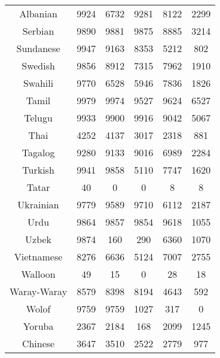 \begin{figure}[h]
\begin{tabular}{cccccc}
Albanian&9924&6732&9281&8122&2299\\
Serbian&9890&9881&9875&8885&3214\\
Sundanese&9947&9163&8353&5212&802\\
Swedish&9856&8912&7315&7962&1910\\
Swahili&9770&6528&5946&7836&1826\\
Tamil&9979&9974&9527&9624&6527\\
Telugu&9933&9900&9916&9042&5067\\
Thai&4252&4137&3017&2318&881\\
Tagalog&9280&9133&9016&6989&2284\\
Turkish&9941&9858&5110&7747&1620\\
Tatar&40&0&0&8&8\\
Ukrainian&9779&9589&9710&6112&2187\\
Urdu&9864&9857&9854&9618&1055\\
Uzbek&9874&160&290&6360&1070\\
Vietnamese&8276&6636&5124&7007&2755\\
Walloon&49&15&0&28&18\\
Waray-Waray&8579&8398&8194&4643&592\\
Wolof&9759&9759&1027&317&0\\
Yoruba&2367&2184&168&2099&1245\\
Chinese&3647&3510&2522&2779&977\\
\hline\hline
\end{tabular}
\end{figure}
